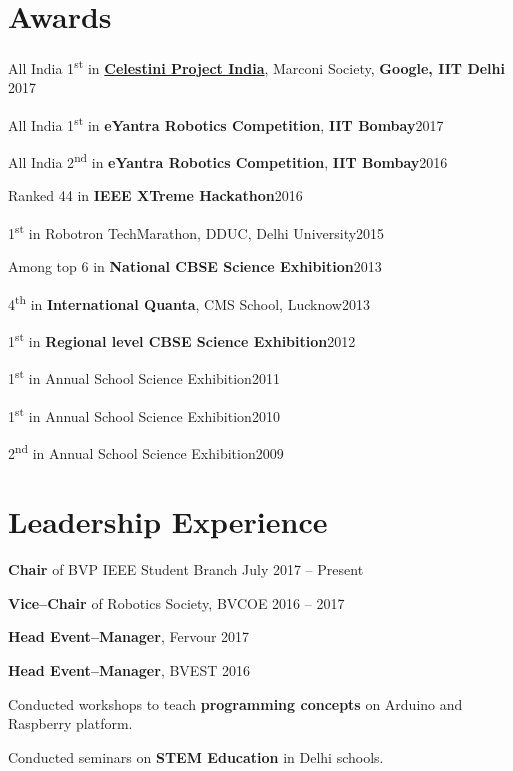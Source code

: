 \section{Awards}
\begin{innerlist}
\item All India 1\textsuperscript{st} in \textbf{\href{http://www.celestiniprojectindia.com}{Celestini Project India}}, Marconi Society, \textbf{Google, IIT Delhi} \hfill 2017
\item All India 1\textsuperscript{st} in \textbf{eYantra Robotics Competition}, \textbf{IIT Bombay}\hfill 2017
\item All India 2\textsuperscript{nd} in \textbf{eYantra Robotics Competition}, \textbf{IIT Bombay}\hfill 2016
\item Ranked 44 in \textbf{IEEE XTreme Hackathon}\hfill  2016
\item 1\textsuperscript{st} in Robotron TechMarathon, DDUC, Delhi University\hfill 2015
\item Among top 6 in \textbf{National CBSE Science Exhibition}\hfill  2013
\item 4\textsuperscript{th} in \textbf{International Quanta}, CMS School, Lucknow\hfill 2013
\item 1\textsuperscript{st} in \textbf{Regional level CBSE Science Exhibition}\hfill  2012
\item 1\textsuperscript{st} in Annual School Science Exhibition\hfill 2011
\item 1\textsuperscript{st} in Annual School Science Exhibition\hfill  2010
\item 2\textsuperscript{nd} in Annual School Science Exhibition\hfill  2009
\end{innerlist}

\halfblankline

\section{Leadership Experience}
\begin{innerlist}
    \item \textbf{Chair} of BVP IEEE Student Branch \hfill {July 2017 -- Present}
    \item \textbf{Vice--Chair} of Robotics Society, BVCOE \hfill {2016 -- 2017}
    \item \textbf{Head Event--Manager}, Fervour \hfill {2017}
    \item \textbf{Head Event--Manager}, BVEST \hfill {2016}
    \item Conducted workshops to teach \textbf{programming concepts} on Arduino and Raspberry platform.
    \item Conducted seminars on \textbf{STEM Education} in Delhi schools.
\end{innerlist}

